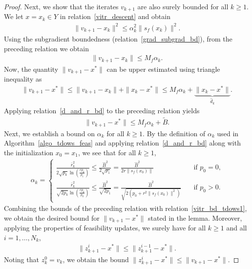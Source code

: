 \documentclass{article}
\theoremstyle{plain}
\theoremstyle{definition}
\theoremstyle{remark}
\begin{document}
\begin{proof}
    Next, we show that the iterates $v_{k+1}$ are also surely bounded for all $k \geq 1$. We let $x = x_k \in Y$ in relation~\eqref{vitr_descent} and obtain
    \begin{align*}
        \|v_{k+1} - x_k\|^2 \leq \alpha_k^2 \|s_f(x_k)\|^2 .
    \end{align*}
    Using the subgradient boundedness (relation~\eqref{grad_subgrad_bd}), from the preceding relation we obtain
    \begin{align*}
        \|v_{k+1} - x_k\| \leq M_f \alpha_k .
    \end{align*}
    Now, the quantity $\|v_{k+1} - x^*\|$ can be upper estimated using triangle inequality as
    \begin{align*}
        \|v_{k+1} - x^*\| \leq \|v_{k+1} - x_k\| + \|x_k - x^*\| \leq M_f \alpha_k + \underbrace{\|x_k - x^*\|}_{\hat d_k} .
    \end{align*}
    Applying relation~\eqref{d_and_r_bd} to the preceding relation yields
    \begin{align}
        \|v_{k+1} - x^*\| \leq M_f \alpha_k + \widetilde B . \label{vitr_bd_tdows1}
    \end{align}
    Next, we establish a bound on $\alpha_k$ for all $k \geq 1$. By the definition of $\alpha_k$ used in Algorithm~\ref{algo_tdows_feas} and applying relation~\eqref{d_and_r_bd} along with the initialization $x_0 = x_1$, we see that for all $k \geq 1$,
    \begin{align*}
        \alpha_k = \begin{cases}
        \frac{\bar{r}_k^2}{2 \sqrt{p_k} \ln \left( \frac{e p_k}{p_1} \right)} \leq \frac{\widehat B^2}{2 \sqrt{p_1}} = \frac{\widehat B^2}{2 r \|s_f(x_0)\|} \quad &\text{if $p_0 = 0$,} \\
        \frac{\bar{r}_k^2}{\sqrt{2 p_k} \ln \left( \frac{e p_k}{p_0} \right)} \leq \frac{\widehat B^2}{\sqrt{2 p_1}} = \frac{\widehat B^2}{\sqrt{2(p_0 + r^2 \|s_f(x_0)\|^2)}} \quad &\text{if $p_0 > 0$.}
    \end{cases}
    \end{align*}
    Combining the bounds of the preceding relation with relation~\eqref{vitr_bd_tdows1}, we obtain the desired bound for $\|v_{k+1} - x^*\|$ stated in the lemma. Moreover, applying the properties of feasibility updates, we surely have for all $k \geq 1$ and all $i = 1, \ldots, N_k$,
    \begin{align*}
        \|z_{k+1}^{i} - x^*\| \leq \|z_{k+1}^{i-1} - x^*\| .
    \end{align*}
    Noting  that $z_k^{0} = v_k$, we obtain the bound $\|z_{k+1}^{i} - x^*\| \leq \|v_{k+1} - x^*\|$.
\end{proof}
\end{document}
